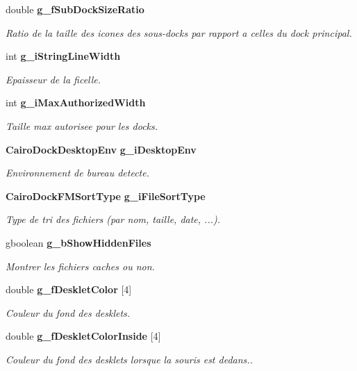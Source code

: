 \begin{CompactItemize}
double {\bf g\_\-fSubDockSizeRatio}
\begin{CompactList}\small\item\em Ratio de la taille des icones des sous-docks par rapport a celles du dock principal. \item\end{CompactList}\item 
int {\bf g\_\-iStringLineWidth}
\begin{CompactList}\small\item\em Epaisseur de la ficelle. \item\end{CompactList}\item 
int {\bf g\_\-iMaxAuthorizedWidth}
\begin{CompactList}\small\item\em Taille max autorisee pour les docks. \item\end{CompactList}\item 
{\bf CairoDockDesktopEnv} {\bf g\_\-iDesktopEnv}
\begin{CompactList}\small\item\em Environnement de bureau detecte. \item\end{CompactList}\item 
{\bf CairoDockFMSortType} {\bf g\_\-iFileSortType}
\begin{CompactList}\small\item\em Type de tri des fichiers (par nom, taille, date, ...). \item\end{CompactList}\item 
gboolean {\bf g\_\-bShowHiddenFiles}
\begin{CompactList}\small\item\em Montrer les fichiers caches ou non. \item\end{CompactList}\item 
double {\bf g\_\-fDeskletColor} [4]
\begin{CompactList}\small\item\em Couleur du fond des desklets. \item\end{CompactList}\item 
double {\bf g\_\-fDeskletColorInside} [4]
\begin{CompactList}\small\item\em Couleur du fond des desklets lorsque la souris est dedans.. \item\end{CompactList}\end{CompactItemize}


